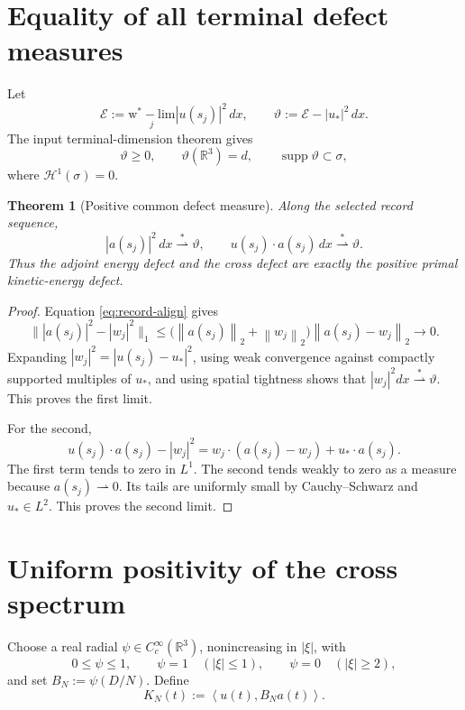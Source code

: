 \documentclass[11pt]{article}
\newtheorem{theorem}{Theorem}
\theoremstyle{remark}
\newcommand{\R}{\mathbb R}
\newcommand{\norm}[1]{\left\|#1\right\|}
\newcommand{\ip}[2]{\left\langle#1,#2\right\rangle}
\newcommand{\weakto}{\rightharpoonup}
\begin{document}
\section{Equality of all terminal defect measures}

Let
\[
 \mathcal E
 :=\operatorname*{w^*\!-\!lim}_j
 |u(s_j)|^2\,dx,\qquad
 \vartheta:=\mathcal E-|u_*|^2\,dx.
\]
The input terminal-dimension theorem gives
\[
 \vartheta\geq0,\qquad
 \vartheta(\R^3)=d,\qquad
 \operatorname{supp}\vartheta\subset\sigma,
\]
where \(\mathcal H^1(\sigma)=0\).

\begin{theorem}[Positive common defect measure]
\label{thm:measures}
Along the selected record sequence,
\begin{equation}
\label{eq:measure-equality}
 |a(s_j)|^2\,dx
 \overset{*}{\rightharpoonup}\vartheta,\qquad
 u(s_j)\cdot a(s_j)\,dx
 \overset{*}{\rightharpoonup}\vartheta.
\end{equation}
Thus the adjoint energy defect and the cross defect are exactly the
positive primal kinetic-energy defect.
\end{theorem}

\begin{proof}
Equation \eqref{eq:record-align} gives
\[
 \bigl\||a(s_j)|^2-|w_j|^2\bigr\|_1
 \leq
 \bigl(\norm{a(s_j)}_2+\norm{w_j}_2\bigr)
 \norm{a(s_j)-w_j}_2
 \longrightarrow0.
\]
Expanding \(|w_j|^2=|u(s_j)-u_*|^2\), using weak convergence against
compactly supported multiples of \(u_*\), and using spatial tightness
shows that \(|w_j|^2dx\overset{*}{\rightharpoonup}\vartheta\).
This proves the first limit.

For the second,
\[
 u(s_j)\cdot a(s_j)-|w_j|^2
 =
 w_j\cdot(a(s_j)-w_j)+u_*\cdot a(s_j).
\]
The first term tends to zero in \(L^1\).  The second tends weakly to
zero as a measure because \(a(s_j)\weakto0\).  Its tails are uniformly
small by Cauchy--Schwarz and \(u_*\in L^2\).  This proves the second
limit.
\end{proof}

\section{Uniform positivity of the cross spectrum}

Choose a real radial
\(\psi\in C_c^\infty(\R^3)\), nonincreasing in \(|\xi|\), with
\[
 0\leq\psi\leq1,\qquad
 \psi=1\quad(|\xi|\leq1),\qquad
 \psi=0\quad(|\xi|\geq2),
\]
and set \(B_N:=\psi(D/N)\).  Define
\begin{equation}
\label{eq:KN}
 K_N(t):=\ip{u(t)}{B_Na(t)}.
\end{equation}
\end{document}
